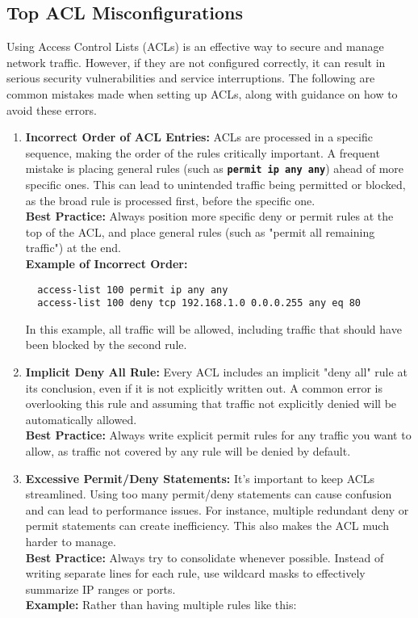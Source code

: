 \documentclass[11pt,a4paper]{article}
\begin{document}
    \subsection*{Top ACL Misconfigurations}
    Using Access Control Lists (ACLs) is an effective way to secure and manage network traffic. However, if they are not configured correctly, it can result in serious security vulnerabilities and service interruptions. The following are common mistakes made when setting up ACLs, along with guidance on how to avoid these errors.
    \begin{enumerate}
        \item \textbf{Incorrect Order of ACL Entries:} ACLs are processed in a specific sequence, making the order of the rules critically important. A frequent mistake is placing general rules (such as \textbf{\lstinline{permit ip any any}}) ahead of more specific ones. This can lead to unintended traffic being permitted or blocked, as the broad rule is processed first, before the specific one.
        \\[1em]
        \textbf{Best Practice:} Always position more specific deny or permit rules at the top of the ACL, and place general rules (such as "permit all remaining traffic") at the end.
        \\[1em]
        \textbf{Example of Incorrect Order:}
\begin{lstlisting}
  access-list 100 permit ip any any
  access-list 100 deny tcp 192.168.1.0 0.0.0.255 any eq 80                                           
\end{lstlisting}
        In this example, all traffic will be allowed, including traffic that should have been blocked by the second rule.

        \item \textbf{Implicit Deny All Rule:} Every ACL includes an implicit "deny all" rule at its conclusion, even if it is not explicitly written out. A common error is overlooking this rule and assuming that traffic not explicitly denied will be automatically allowed.
        \\[1em]
        \textbf{Best Practice:} Always write explicit permit rules for any traffic you want to allow, as traffic not covered by any rule will be denied by default.

        \item \textbf{Excessive Permit/Deny Statements:} It's important to keep ACLs streamlined. Using too many permit/deny statements can cause confusion and can lead to performance issues. For instance, multiple redundant deny or permit statements can create inefficiency. This also makes the ACL much harder to manage.
        \\[1em]
        \textbf{Best Practice:} Always try to consolidate whenever possible. Instead of writing separate lines for each rule, use wildcard masks to effectively summarize IP ranges or ports.
        \\[1em]
        \textbf{Example:} Rather than having multiple rules like this:


\end{enumerate}
\end{document}
